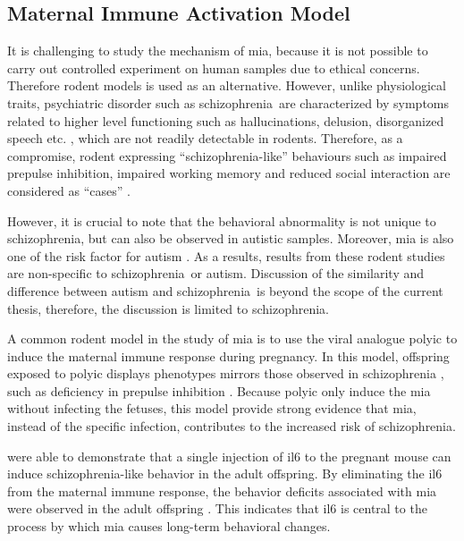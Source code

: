 \documentclass[12pt]{scrbook}
\newcommand*{\scz}{schizophrenia}
\begin{document}
\subsection{Maternal Immune Activation Model}
It is challenging to study the mechanism of \gls{mia}, because it is not possible to carry out controlled experiment on human samples due to ethical concerns.
Therefore rodent models is used as an alternative.
However, unlike physiological traits, psychiatric disorder such as \scz\ are characterized by symptoms related to higher level functioning such as hallucinations, delusion, disorganized speech etc. \citep{dsm2013diagnostic}, which are not readily detectable in rodents.
Therefore, as a compromise, rodent expressing ``\scz-like'' behaviours such as impaired prepulse inhibition, impaired working memory and reduced social interaction are considered as ``cases'' \citep{Meyer2007a}.

However, it is crucial to note that the behavioral abnormality is not unique to \scz, but can also be observed in autistic samples.
Moreover, \gls{mia} is also one of the risk factor for autism \citep{Brown2012}.
As a results, results from these rodent studies are non-specific to \scz\ or autism.
Discussion of the similarity and difference between autism and \scz\ is beyond the scope of the current thesis, therefore, the discussion is limited to \scz.

A common rodent model in the study of \gls{mia} is to use the viral analogue \gls{polyic} to induce the maternal immune response during pregnancy.
In this model, offspring exposed to \gls{polyic} displays phenotypes mirrors those observed in schizophrenia \citep{Li2009c,Meyer2009b,Li2010a}, such as deficiency in prepulse inhibition \citep{Cadenhead2000}.
Because \gls{polyic} only induce the \gls{mia} without infecting the fetuses, this model provide strong evidence that \gls{mia}, instead of the specific infection, contributes to the increased risk of \scz.	
	
\citet{Smith2007} were able to demonstrate that a single injection of \gls{il6} to the pregnant mouse can induce \scz-like behavior in the adult offspring. 
By eliminating the \gls{il6} from the maternal immune response, the behavior deficits associated with \gls{mia} were observed in the adult offspring \citep{Smith2007}.
This indicates that \gls{il6} is central to the process by which \gls{mia} causes long-term behavioral changes.
\end{document}

